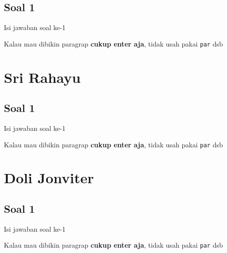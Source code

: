 \subsection{Soal 1}
Isi jawaban soal ke-1

Kalau mau dibikin paragrap \textbf{cukup enter aja}, tidak usah pakai \verb|par| dsb



\section{Sri Rahayu}
\subsection{Soal 1}
Isi jawaban soal ke-1

Kalau mau dibikin paragrap \textbf{cukup enter aja}, tidak usah pakai \verb|par| dsb



\section{Doli Jonviter}
\subsection{Soal 1}
Isi jawaban soal ke-1

Kalau mau dibikin paragrap \textbf{cukup enter aja}, tidak usah pakai \verb|par| dsb


